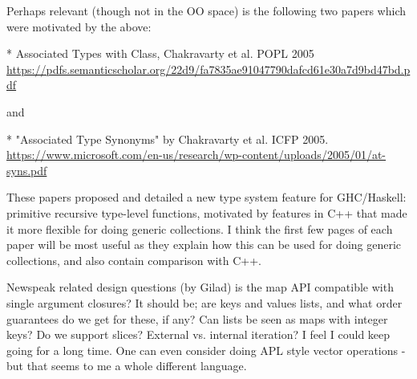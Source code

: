 \documentclass[sigconf, 10pt]{acmart}
\begin{document}
\begin{note}
Perhaps relevant (though not in the OO space) is the following two papers which were motivated by the above:

* Associated Types with Class, Chakravarty et al. POPL 2005
\url{https://pdfs.semanticscholar.org/22d9/fa7835ae91047790dafcd61e30a7d9bd47bd.pdf}

and

* "Associated Type Synonyms" by Chakravarty et al. ICFP 2005.
\url{https://www.microsoft.com/en-us/research/wp-content/uploads/2005/01/at-syns.pdf}

These papers proposed and detailed a new type system feature for GHC/Haskell: primitive recursive type-level functions, motivated by features in C++ that made it more flexible for doing generic collections. I think the first few pages of each paper will be most useful as they explain how this can be used for doing generic collections, and also contain comparison with C++.


  
Newspeak related design questions (by Gilad)
is the map API compatible with single argument closures? It should be; are keys and values lists, and what order guarantees do we get for these, if any? Can lists be seen as maps with integer keys? Do we support slices? External vs. internal iteration? I feel I could keep going for a long time. One can even consider doing APL style vector operations - but that seems to me a whole different language.





\end{note} 






\end{document}

